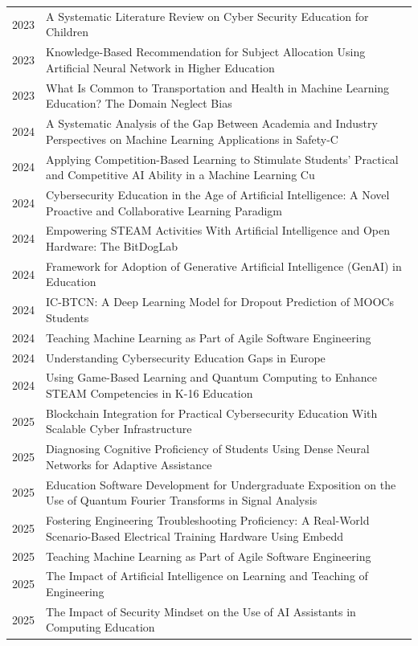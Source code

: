 \documentclass[10pt]{article}
\begin{document}
\begin{longtable}{@{}lL{14cm}@{}}
2023 & A Systematic Literature Review on Cyber Security Education for Children \\
2023 & Knowledge-Based Recommendation for Subject Allocation Using Artificial Neural Network in Higher Education \\
2023 & What Is Common to Transportation and Health in Machine Learning Education? The Domain Neglect Bias \\
2024 & A Systematic Analysis of the Gap Between Academia and Industry Perspectives on Machine Learning Applications in Safety-C \\
2024 & Applying Competition-Based Learning to Stimulate Students’ Practical and Competitive AI Ability in a Machine Learning Cu \\
2024 & Cybersecurity Education in the Age of Artificial Intelligence: A Novel Proactive and Collaborative Learning Paradigm \\
2024 & Empowering STEAM Activities With Artificial Intelligence and Open Hardware: The BitDogLab \\
2024 & Framework for Adoption of Generative Artificial Intelligence (GenAI) in Education \\
2024 & IC-BTCN: A Deep Learning Model for Dropout Prediction of MOOCs Students \\
2024 & Teaching Machine Learning as Part of Agile Software Engineering \\
2024 & Understanding Cybersecurity Education Gaps in Europe \\
2024 & Using Game-Based Learning and Quantum Computing to Enhance STEAM Competencies in K-16 Education \\
2025 & Blockchain Integration for Practical Cybersecurity Education With Scalable Cyber Infrastructure \\
2025 & Diagnosing Cognitive Proficiency of Students Using Dense Neural Networks for Adaptive Assistance \\
2025 & Education Software Development for Undergraduate Exposition on the Use of Quantum Fourier Transforms in Signal Analysis \\
2025 & Fostering Engineering Troubleshooting Proficiency: A Real-World Scenario-Based Electrical Training Hardware Using Embedd \\
2025 & Teaching Machine Learning as Part of Agile Software Engineering \\
2025 & The Impact of Artificial Intelligence on Learning and Teaching of Engineering \\
2025 & The Impact of Security Mindset on the Use of AI Assistants in Computing Education \\
\end{longtable}
\end{document}
